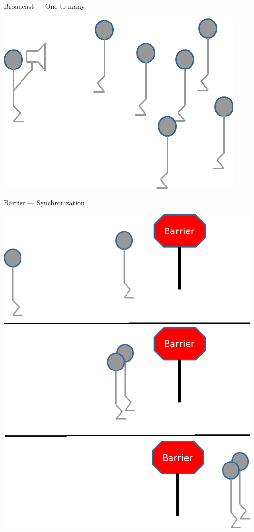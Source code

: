 \begin{frame}
  \begin{block}{Broadcast --- One-to-many}
    \begin{center}
      \includegraphics[scale=.6]{../common/pics/mpiops/mpi_bcast}
    \end{center}
  \end{block}
\end{frame}


\begin{frame}
  \begin{block}{Barrier --- Synchronization}
    \begin{center}
      \includegraphics[scale=.38]{../common/pics/mpiops/mpi_barrier}
    \end{center}
  \end{block}
\end{frame}
